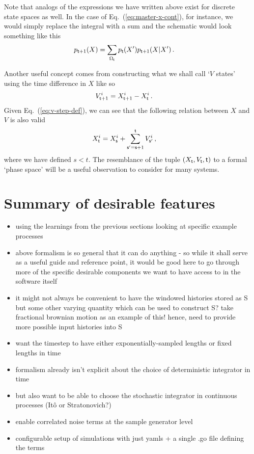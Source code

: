 \documentclass{book}
\begin{document}
Note that analogs of the expressions we have written above exist for discrete state spaces as well. In the case of Eq.~(\ref{eq:master-x-cont}), for instance, we would simply replace the integral with a sum and the schematic would look something like this
\begin{align}
p_{{\sf t}+1}(X) &= \sum_{\Omega_{\sf t}} p_{\sf t}(X') p_{{\sf t}+1}(X \vert X') \label{eq:master-x-disc} \,.
\end{align}

Another useful concept comes from constructing what we shall call `$V$ states' using the time difference in $X$ like so
\begin{align}
V^{i}_{{\sf t}+1} &= X^{i}_{{\sf t}+1} - X^{i}_{\sf t} \label{eq:v-step-def}\,.
\end{align}
Given Eq.~(\ref{eq:v-step-def}), we can see that the following relation between $X$ and $V$ is also valid
\begin{align}
X^{i}_{\sf t} &= X_{\sf s}^{i} + \sum_{{\sf s}'={\sf s}+1}^{\sf t}V_{{\sf s}'}^{i} \label{eq:x-implicit-solution} \,,
\end{align}
where we have defined $s<t$. The resemblance of the tuple $(X_{\sf t}, V_{\sf t}, {\sf t})$ to a formal `phase space' will be a useful observation to consider for many systems.


\section{\sffamily Summary of desirable features}

\begin{itemize}
\item{using the learnings from the previous sections looking at specific example processes}
\item{above formalism is so general that it can do anything - so while it shall serve as a useful guide and reference point, it would be good here to go through more of the specific desirable components we want to have access to in the software itself}
\item{it might not always be convenient to have the windowed histories stored as S but some other varying quantity which can be used to construct S? take fractional brownian motion as an example of this! hence, need to provide more possible input histories into S}
\item{want the timestep to have either exponentially-sampled lengths or fixed lengths in time}
\item{formalism already isn't explicit about the choice of deterministic integrator in time}
\item{but also want to be able to choose the stochastic integrator in continuous processes (Itô or Stratonovich?)}
\item{enable correlated noise terms at the sample generator level}
\item{configurable setup of simulations with just yamls + a single .go file defining the terms}
\end{itemize}
\end{document}
